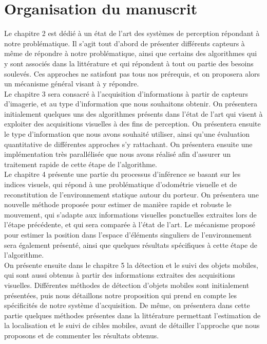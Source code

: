 \section{Organisation du manuscrit}
Le chapitre 2 est dédié à un état de l'art des systèmes de perception répondant à notre problématique. Il s'agit tout d'abord de présenter différents capteurs à même de répondre à notre problématique, ainsi que certains des algorithmes qui y sont associés dans la littérature et qui répondent à tout ou partie des besoins soulevés. Ces approches ne satisfont pas tous nos prérequis, et on proposera alors un mécanisme général visant à y répondre.\\

Le chapitre 3 sera consacré à l'acquisition d'informations à partir de capteurs d'imagerie, et au type d'information que nous souhaitons obtenir. On présentera initialement quelques uns des algorithmes présents dans l'état de l'art qui visent à exploiter des acquisitions visuelles à des fins de perception. On présentera ensuite le type d'information que nous avons souhaité utiliser, ainsi qu'une évaluation quantitative de différentes approches s'y rattachant. On présentera ensuite une implémentation très parallélisée que nous avons réalisé afin d'assurer un traitement rapide de cette étape de l'algorithme.\\

Le chapitre 4 présente une partie du processus d'inférence se basant sur les indices visuels, qui répond à une problématique d'odométrie visuelle et de reconstitution de l'environnement statique autour du porteur. On présentera une nouvelle méthode proposée pour estimer de manière rapide et robuste le mouvement, qui s'adapte aux informations visuelles ponctuelles extraites lors de l'étape précédente, et qui sera comparée à l'état de l'art. Le mécanisme proposé pour estimer la position dans l'espace d'éléments singuliers de l'environnement sera également présenté, ainsi que quelques résultats spécifiques à cette étape de l'algorithme.\\

On présente ensuite dans le chapitre 5 la détection et le suivi des objets mobiles, qui sont aussi obtenus à partir des informations extraites des acquisitions visuelles. Différentes méthodes de détection d'objets mobiles sont initialement présentées, puis nous détaillons notre proposition qui prend en compte les spécificités de notre système d'acquisition. De même, on présentera dans cette partie quelques méthodes présentes dans la littérature permettant l'estimation de la localisation et le suivi de cibles mobiles, avant de détailler l'approche que nous proposons et de commenter les résultats obtenus.\\

